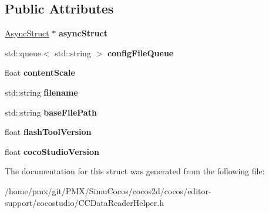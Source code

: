 \subsection*{Public Attributes}
\begin{DoxyCompactItemize}
\item 
\mbox{\label{structcocostudio_1_1DataReaderHelper_1_1__DataInfo_a182bb57d924afd94e246ce9d372571ca}} 
\hyperlink{structcocostudio_1_1DataReaderHelper_1_1__AsyncStruct}{Async\+Struct} $\ast$ {\bfseries async\+Struct}
\item 
\mbox{\label{structcocostudio_1_1DataReaderHelper_1_1__DataInfo_a1aa35da7201c774fe66b6bafc43e0c1e}} 
std\+::queue$<$ std\+::string $>$ {\bfseries config\+File\+Queue}
\item 
\mbox{\label{structcocostudio_1_1DataReaderHelper_1_1__DataInfo_a305d493120ed056771639936a62b4a34}} 
float {\bfseries content\+Scale}
\item 
\mbox{\label{structcocostudio_1_1DataReaderHelper_1_1__DataInfo_aded361ebc93f5a4636b90442ba9bff0f}} 
std\+::string {\bfseries filename}
\item 
\mbox{\label{structcocostudio_1_1DataReaderHelper_1_1__DataInfo_a53599100aa34268f75650a85f781d3f8}} 
std\+::string {\bfseries base\+File\+Path}
\item 
\mbox{\label{structcocostudio_1_1DataReaderHelper_1_1__DataInfo_af8aecb39c974c66f9d64b4a1888e1ac1}} 
float {\bfseries flash\+Tool\+Version}
\item 
\mbox{\label{structcocostudio_1_1DataReaderHelper_1_1__DataInfo_a8a05dfbf2a8f88848f32c0dbe76ef161}} 
float {\bfseries coco\+Studio\+Version}
\end{DoxyCompactItemize}


The documentation for this struct was generated from the following file\+:\begin{DoxyCompactItemize}
\item 
/home/pmx/git/\+P\+M\+X/\+Simu\+Cocos/cocos2d/cocos/editor-\/support/cocostudio/C\+C\+Data\+Reader\+Helper.\+h\end{DoxyCompactItemize}
